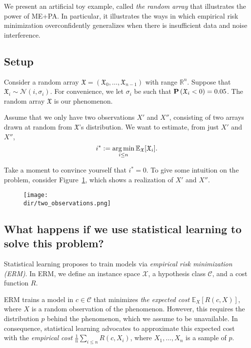 We present an artificial toy example, called \emph{the random array} that illustrates the power of ME+PA. In particular, it illustrates the ways in which empirical risk minimization overconfidently generalizes when there is insufficient data and noise interference.

\subsection{Setup}

Consider a random array $\mathfrak{X} = \left(\mathfrak{X}_0, \ldots, \mathfrak{X}_{n-1}\right)$ with range $\mathbb{R}^n$. Suppose that $\mathfrak{X}_i \sim \mathcal{N}\left(i, \sigma_i\right)$. For convenience, we let $\sigma_i$ be such that $\mathbf{P}\left(\mathfrak{X}_i < 0\right) = 0.05$. The random array $\mathfrak{X}$ is our phenomenon. 

Assume that we only have two observations $X'$ and $X''$, consisting of two arrays drawn at random from $\mathfrak{X}$'s distribution. We want to estimate, from just $X'$ and $X''$,
%
\begin{equation}
i^* := \operatorname*{arg\,min}_{i \leq n} \mathbb{E}_{\mathfrak{X}}[\mathfrak{X}_i].
\end{equation}

Take a moment to convince yourself that $i^* = 0$. To give some intuition on the problem, 
consider Figure~\ref{fig:illustration_random_array}, which shows a realization of $X'$ and $X''$. 

\begin{figure}[hbtp]
\centering
\texttt{[image: \\dir/two\_observations.png]}
\caption{}
\label{fig:illustration_random_array}
\end{figure}

\subsection{What happens if we use statistical learning to solve this problem?}

Statistical learning proposes to train models via \emph{empirical risk minimization (ERM)}. In ERM, we define an instance space $\mathcal{X}$, a hypothesis class $\mathcal{C}$, and a cost function $R$. 

ERM trains a model in $c \in \mathcal{C}$ that minimizes \emph{the expected cost} $\mathbb{E}_X[R(c, X)]$, where $X$ is a random observation of the phenomenon. However, this requires the distribution $p$ behind the phenomenon, which we assume to be unavailable. In consequence, statistical learning advocates to approximate this expected cost with the \emph{empirical cost} $\frac{1}{n} \sum_{i \leq n} R(c, X_i)$, where $X_1, \ldots, X_n$ is a sample of $p$.

